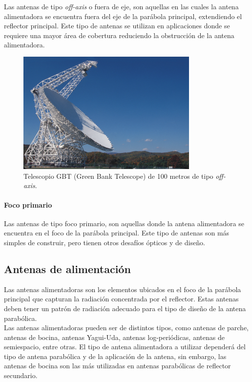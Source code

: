 Las antenas de tipo \textit{off-axis} o fuera de eje, son aquellas en las cuales la antena alimentadora se encuentra fuera del eje de la parábola principal, extendiendo el reflector principal. Este tipo de antenas se utilizan en aplicaciones donde se requiere una mayor área de cobertura reduciendo la obstrucción de la antena alimentadora.

\begin{figure}
    \centering
    \includegraphics[width = 0.8\textwidth]{img/off-axis.jpg}
    \caption{Telescopio GBT (Green Bank Telescope) de 100 metros de tipo \textit{off-axis}.}
    \label{fig:off}
\end{figure}


\paragraph{Foco primario}

Las antenas de tipo foco primario, son aquellas donde la antena alimentadora se encuentra en el foco de la parábola principal. Este tipo de antenas son más simples de construir, pero tienen otros desafíos ópticos y de diseño.\\

\subsection{Antenas de alimentación}

Las antenas alimentadoras son los elementos ubicados en el foco de la parábola principal que capturan la radiación concentrada por el reflector. Estas antenas deben tener un patrón de radiación adecuado para el tipo de diseño de la antena parabólica.\\

Las antenas alimentadoras pueden ser de distintos tipos, como antenas de parche, antenas de bocina, antenas Yagui-Uda, antenas log-periódicas, antenas de semiespacio, entre otras. El tipo de antena alimentadora a utilizar dependerá del tipo de antena parabólica y de la aplicación de la antena, sin embargo, las antenas de bocina son las más utilizadas en antenas parabólicas de reflector secundario.\\


